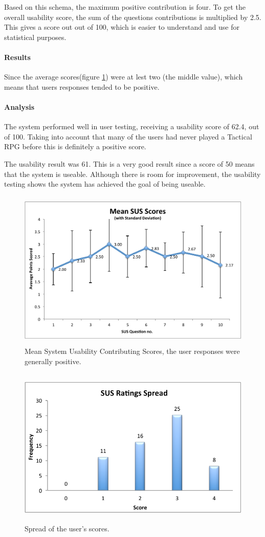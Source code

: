 Based on this schema, the maximum positive contribution is four. To get the overall usability score, the sum of the questions contributions is multiplied by 2.5.  This gives  a score out out of 100, which is easier to understand and use for statistical purposes.

\paragraph{Results\\}
Since the average scores(figure \ref{fig:figures_SUS_Mean}) were at lest two (the middle value), which means that users responses tended to be positive. 

\paragraph{Analysis\\}

The system performed well in user testing, receiving a usability score of 62.4, out of 100. Taking into account that many of the users had never played a Tactical RPG before this is definitely a positive score. 

The usability result was 61. This is a very good result since a score of 50 means that the system is useable. Although there is room for improvement, the usability testing shows the system has achieved the goal of being useable.

\begin{figure}[htb]
	\centering
		\includegraphics[height=3in]{figures/SUS_Mean.pdf}
	\caption{Mean System Usability Contributing Scores, the user responses were generally positive.}
	\label{fig:figures_SUS_Mean}
\end{figure}

\begin{figure}[htb]
	\centering
		\includegraphics[height=3in]{figures/SUS_Spread.pdf}
	\caption{Spread of the user's scores.}
	\label{fig:figures_SUS_Spread}
\end{figure}